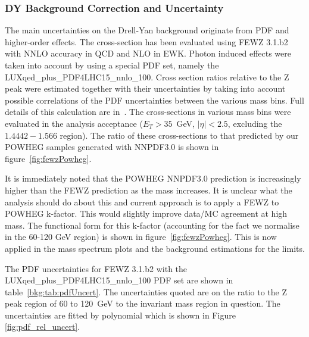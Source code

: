 \subsubsection{DY Background Correction and Uncertainty}
\label{sec:dyBkgCorr}
The main uncertainties on the Drell-Yan background originate from PDF and higher-order effects.
The cross-section has been evaluated using FEWZ 3.1.b2 with NNLO accuracy in QCD and NLO in EWK.
Photon induced effects were taken into account by using a special PDF set, namely the LUXqed\_plus\_PDF4LHC15\_nnlo\_100.
Cross section ratios relative to the Z peak were estimated together with their uncertainties by taking into account possible correlations
of the PDF uncertainties between the various mass bins. Full details of this calculation are in~\cite{AN-16-053}.
The cross-sections in various mass bins were evaluated in the analysis acceptance ($E_T>35$~GeV, $|\eta|<2.5$, excluding the $1.4442-1.566$ region).
The ratio of these cross-sections to that predicted by our POWHEG samples generated with NNPDF3.0 is shown in figure~\ref{fig:fewzPowheg}.


It is immediately noted that the POWHEG NNPDF3.0 prediction is increasingly higher than the FEWZ prediction as the mass increases.
It is unclear what the analysis should do about this and current approach is to apply a FEWZ to POWHEG k-factor.
This would slightly improve data/MC agreement at high mass. The functional form for
this k-factor (accounting for the fact we normalise in the 60-120 GeV region) is shown
in figure~\ref{fig:fewzPowheg}. This is now applied in the mass spectrum plots and the background estimations for the limits.

The PDF uncertainties for FEWZ 3.1.b2 with the LUXqed\_plus\_PDF4LHC15\_nnlo\_100 PDF set are shown in table~\ref{bkg:tab:pdfUncert}.
The uncertainties quoted are on the ratio to the Z peak region of 60 to 120~GeV to the invariant mass region in question. The uncertainties are fitted by
polynomial which is shown in Figure \ref{fig:pdf_rel_uncert}.


